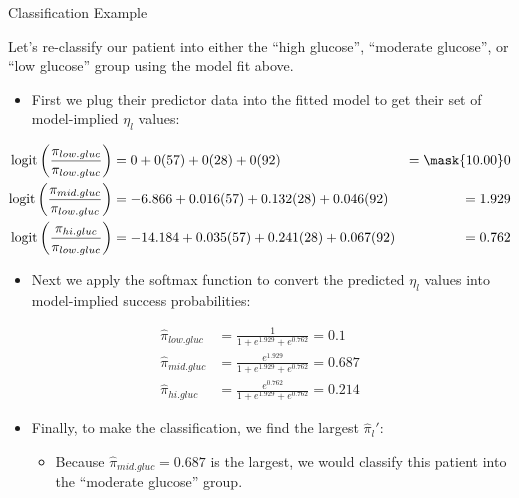 \documentclass{beamer}\usepackage[]{graphicx}\usepackage[]{color}
\begin{document}
\begin{frame}{Classification Example}
  


Let's re-classify our patient into either the ``high glucose'', ``moderate 
glucose'', or ``low glucose'' group using the model fit above.
\vb
\begin{itemize}
\item First we plug their predictor data into the fitted model to get their 
  set of model-implied $\eta_l$ values:
\end{itemize}
\begin{align*}
  \text{logit}\left(\frac{\pi_{low.gluc}}{\pi_{low.gluc}}\right) &= 
  0 + 0 (57) + 0 (28) + 0 (92) &= 
  \mask{10.00} 0\\
  \text{logit}\left(\frac{\pi_{mid.gluc}}{\pi_{low.gluc}}\right) &=
  -6.866 + 0.016 (57) + 0.132 (28) + 0.046 (92) &= %
  1.929\\
  \text{logit}\left(\frac{\pi_{hi.gluc}}{\pi_{low.gluc}}\right) &=
  -14.184 + 0.035 (57) + 0.241 (28) + 0.067 (92) &= %
  0.762
\end{align*}

\pagebreak

\begin{itemize}
\item Next we apply the softmax function to convert the predicted $\eta_l$ 
  values into model-implied success probabilities:
\end{itemize}
\begin{align*}
  \hat{\pi}_{low.gluc} &=  
  \frac{1}{1 + e^{1.929} + e^{0.762}} = 
  0.1\\
  \hat{\pi}_{mid.gluc} &= 
  \frac{e^{1.929}}{1 + e^{1.929} + e^{0.762}} = 
  0.687\\
  \hat{\pi}_{hi.gluc} &= 
  \frac{e^{0.762}}{1 + e^{1.929} + e^{0.762}} =
  0.214  
\end{align*}
\begin{itemize}
\item Finally, to make the classification, we find the largest $\hat{\pi}_l'$:
  \vb
  \begin{itemize}
  \item Because $\hat{\pi}_{mid.gluc} = 0.687$ is the 
    largest, we would classify this patient into the 
    ``moderate glucose'' group.
  \end{itemize}
\end{itemize}

\end{frame}
\end{document}
